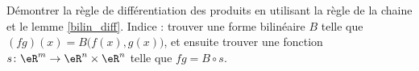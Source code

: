 \begin{exercice}\label{exoGeomAnal-0012}

	Démontrer la règle de différentiation des produits en utilisant la règle de la chaine et le lemme \ref{bilin_diff}. Indice : trouver une forme bilinéaire $B$ telle que $(fg)(x)=B\big( f(x),g(x) \big)$, et ensuite trouver une fonction $s\colon \eR^m\to \eR^n\times\eR^n$ telle que $fg=B\circ s$.

\end{exercice}
